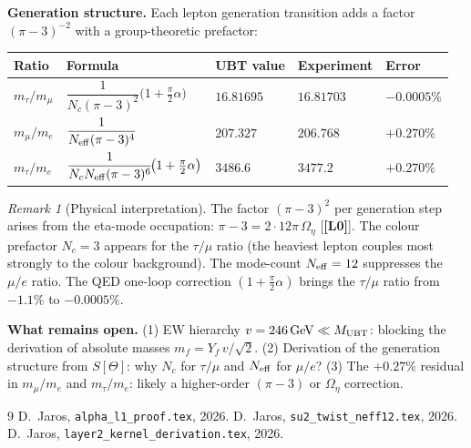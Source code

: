 \documentclass[12pt,a4paper]{article}
\theoremstyle{remark}\newtheorem{remark}[theorem]{Remark}
\theoremstyle{definition}\newtheorem{observation}[theorem]{Observation}
\newcommand{\Lz}{\textbf{[L0]}}
\begin{document}
\begin{resultbox}
\textbf{Generation structure.}
Each lepton generation transition adds a factor $(\pi-3)^{-2}$ with
a group-theoretic prefactor:
\begin{center}
\renewcommand{\arraystretch}{1.4}
\begin{tabular}{lllll}
\toprule
Ratio & Formula & UBT value & Experiment & Error \\
\midrule
$m_\tau/m_\mu$ &
  $\dfrac{1}{N_c(\pi-3)^2}\!\bigl(1+\tfrac\pi2\alpha\bigr)$ &
  $16.81695$ & $16.81703$ & $-0.0005\%$ \\[8pt]
$m_\mu/m_e$ &
  $\dfrac{1}{N_{\rm eff}(\pi-3)^4}$ &
  $207.327$ & $206.768$ & $+0.270\%$ \\[8pt]
$m_\tau/m_e$ &
  $\dfrac{1}{N_c N_{\rm eff}(\pi-3)^6}\!\bigl(1+\tfrac\pi2\alpha\bigr)$ &
  $3486.6$ & $3477.2$ & $+0.270\%$ \\
\bottomrule
\end{tabular}
\end{center}
\end{resultbox}

\begin{remark}[Physical interpretation]
The factor $(\pi-3)^2$ per generation step arises from the eta-mode
occupation: $\pi-3 = 2\cdot12\pi\,\Omega_\eta$ [\Lz].
The colour prefactor $N_c=3$ appears for the $\tau/\mu$ ratio
(the heaviest lepton couples most strongly to the colour background).
The mode-count $N_{\rm eff}=12$ suppresses the $\mu/e$ ratio.
The QED one-loop correction $(1+\tfrac\pi2\alpha)$ brings the
$\tau/\mu$ ratio from $-1.1\%$ to $-0.0005\%$.
\end{remark}

\begin{openprobbox}
\textbf{What remains open.}
(1) EW hierarchy $v=246\,{\rm GeV}\ll M_{\rm UBT}$: blocking the
derivation of absolute masses $m_f = Y_f\,v/\sqrt{2}$.
(2) Derivation of the generation structure from $S[\Theta]$:
why $N_c$ for $\tau/\mu$ and $N_{\rm eff}$ for $\mu/e$?
(3) The $+0.27\%$ residual in $m_\mu/m_e$ and $m_\tau/m_e$:
likely a higher-order $(\pi-3)$ or $\Omega_\eta$ correction.
\end{openprobbox}

\begin{thebibliography}{9}
 D.~Jaros, \texttt{alpha\_l1\_proof.tex}, 2026.
 D.~Jaros, \texttt{su2\_twist\_neff12.tex}, 2026.
 D.~Jaros, \texttt{layer2\_kernel\_derivation.tex}, 2026.
\end{thebibliography}

\ifdefined\INCLUDEMODE\else
\end{document}
